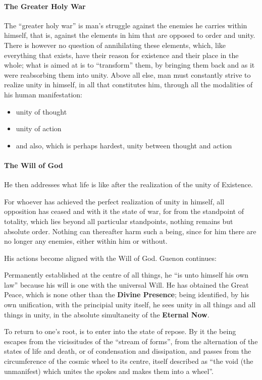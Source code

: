 \paragraph{The Greater Holy War}
\begin{quotex}
The “greater holy war” is man's struggle against the enemies he carries within himself, that is, against the elements in him that are opposed to order and unity. There is however no question of annihilating these elements, which, like everything that exists, have their reason for existence and their place in the whole; what is aimed at is to “transform” them, by bringing them back and as it were reabsorbing them into unity. Above all else, man must constantly strive to realize unity in himself, in all that constitutes him, through all the modalities of his human manifestation:

\end{quotex}
\begin{itemize}
\item unity of thought 
\item unity of action 
\item and also, which is perhaps hardest, unity between thought and action 
\end{itemize}
\paragraph{The Will of God}
He then addresses what life is like after the realization of the unity of Existence.

\begin{quotex}
For whoever has achieved the perfect realization of unity in himself, all opposition has ceased and with it the state of war, for from the standpoint of totality, which lies beyond all particular standpoints, nothing remains but absolute order. Nothing can thereafter harm such a being, since for him there are no longer any enemies, either within him or without.

\end{quotex}
His actions become aligned with the Will of God. Guenon continues:

\begin{quotex}
Permanently established at the centre of all things, he “is unto himself his own law” because his will is one with the universal Will. He has obtained the Great Peace, which is none other than the \textbf{Divine Presence}; being identified, by his own unification, with the principial unity itself, he sees unity in all things and all things in unity, in the absolute simultaneity of the \textbf{Eternal Now}.

To return to one's root, is to enter into the state of repose. By it the being escapes from the vicissitudes of the “stream of forms”, from the alternation of the states of life and death, or of condensation and dissipation, and passes from the circumference of the cosmic wheel to its centre, itself described as “the void (the unmanifest) which unites the spokes and makes them into a wheel”.

\end{quotex}
